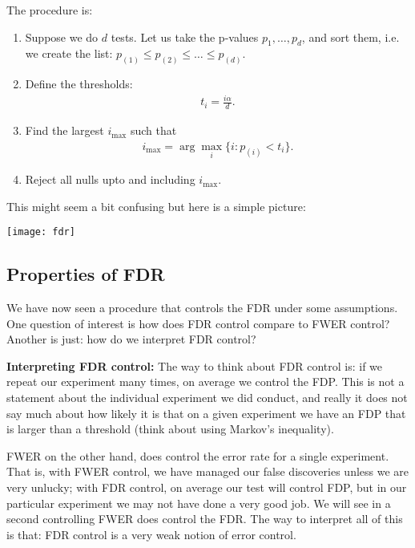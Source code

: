 \documentclass[twoside,12pt]{article}
\begin{document}
The procedure is:
\begin{enumerate}
\item Suppose we do $d$ tests. 
Let us take the p-values $p_1,\ldots,p_d$, and sort them, i.e. we create the list:
$p_{(1)} \leq p_{(2)} \leq \ldots \leq p_{(d)}$.
\item Define the thresholds: 
\begin{align*}
t_i = \frac{i \alpha}{d}.
\end{align*}
\item Find the largest $i_{\max}$ such that
\begin{align*}
i_{\max} = \arg \max_i \{i: p_{(i)} < t_i \}.
\end{align*}
\item Reject all nulls upto and including $i_{\max}$.
\end{enumerate}
This might seem a bit confusing but here is a simple picture:
\begin{center}
\texttt{[image: fdr]}
\end{center}
\subsection{Properties of FDR}
We have now seen a procedure that controls the FDR under some assumptions. One question of
interest is how does FDR control compare to FWER control? Another is just: how do we interpret FDR control?

{\bf Interpreting FDR control: } 
The way to think about FDR control is: if we repeat our experiment many times, on average we
control the FDP. This is not a statement about the individual experiment we did conduct, and
really it does not say much about how likely it is that on a given experiment we 
have an FDP that is larger than a threshold (think about using Markov's inequality). 

FWER on the other hand, does control the error rate for a single experiment. 
That is, with FWER control, we have managed our false discoveries unless we are
very unlucky; with FDR control, on average our test will control FDP, but in our particular experiment  we may not
have done a very good job. We will see in a second controlling FWER does control the FDR. The way to interpret all of this is that: FDR control is a very weak notion of error control.
\end{document}
